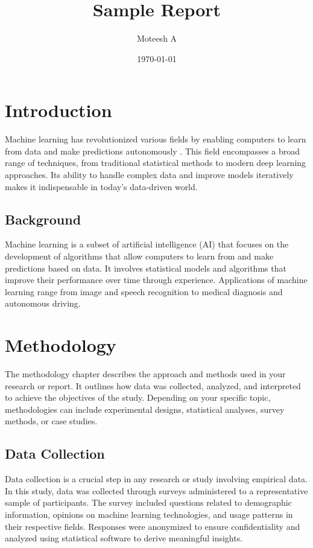 \documentclass{report}
\title{Sample Report}
\author{Moteesh A}
\date{\today}
\begin{document}
\maketitle
\tableofcontents

\chapter{Introduction}

Machine learning has revolutionized various fields by enabling computers to learn from data and make predictions autonomously \cite{bishop_pattern_2006, goodfellow_deep_2016, hastie_elements_2009}. This field encompasses a broad range of techniques, from traditional statistical methods to modern deep learning approaches. Its ability to handle complex data and improve models iteratively makes it indispensable in today's data-driven world.

\section{Background}
Machine learning is a subset of artificial intelligence (AI) that focuses on the development of algorithms that allow computers to learn from and make predictions based on data. It involves statistical models and algorithms that improve their performance over time through experience. Applications of machine learning range from image and speech recognition to medical diagnosis and autonomous driving.

\chapter{Methodology}

The methodology chapter describes the approach and methods used in your research or report. It outlines how data was collected, analyzed, and interpreted to achieve the objectives of the study. Depending on your specific topic, methodologies can include experimental designs, statistical analyses, survey methods, or case studies.

\section{Data Collection}
Data collection is a crucial step in any research or study involving empirical data. In this study, data was collected through surveys administered to a representative sample of participants. The survey included questions related to demographic information, opinions on machine learning technologies, and usage patterns in their respective fields. Responses were anonymized to ensure confidentiality and analyzed using statistical software to derive meaningful insights.
\end{document}

